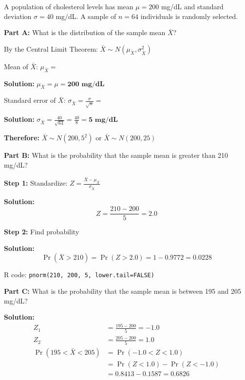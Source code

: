 \documentclass[11pt]{article}
\begin{document}
A population of cholesterol levels has mean $\mu = 200$ mg/dL and standard deviation $\sigma = 40$ mg/dL. A sample of $n = 64$ individuals is randomly selected.

\textbf{Part A:} What is the distribution of the sample mean $\bar{X}$?

By the Central Limit Theorem: $\bar{X} \sim N(\mu_{\bar{X}}, \sigma_{\bar{X}}^2)$

Mean of $\bar{X}$: $\mu_{\bar{X}} = $

\textcolor{correctgreen}{\textbf{Solution:}} $\mu_{\bar{X}} = \mu = \mathbf{200 \text{ mg/dL}}$

Standard error of $\bar{X}$: $\sigma_{\bar{X}} = \frac{\sigma}{\sqrt{n}} = $

\textcolor{correctgreen}{\textbf{Solution:}} $\sigma_{\bar{X}} = \frac{40}{\sqrt{64}} = \frac{40}{8} = \mathbf{5 \text{ mg/dL}}$

\textbf{Therefore:} $\bar{X} \sim N(200, 5^2)$ or $\bar{X} \sim N(200, 25)$

\vspace{0.5cm}

\textbf{Part B:} What is the probability that the sample mean is greater than 210 mg/dL?

\textbf{Step 1:} Standardize: $Z = \frac{\bar{X} - \mu_{\bar{X}}}{\sigma_{\bar{X}}}$

\textcolor{correctgreen}{\textbf{Solution:}}
$$Z = \frac{210 - 200}{5} = 2.0$$

\textbf{Step 2:} Find probability

\textcolor{correctgreen}{\textbf{Solution:}}
$$\Pr(\bar{X} > 210) = \Pr(Z > 2.0) = 1 - 0.9772 = \mathbf{0.0228}$$

R code: \texttt{pnorm(210, 200, 5, lower.tail=FALSE)}

\vspace{0.5cm}

\textbf{Part C:} What is the probability that the sample mean is between 195 and 205 mg/dL?

\textcolor{correctgreen}{\textbf{Solution:}}
\begin{align*}
Z_1 &= \frac{195 - 200}{5} = -1.0\\
Z_2 &= \frac{205 - 200}{5} = 1.0\\
\Pr(195 < \bar{X} < 205) &= \Pr(-1.0 < Z < 1.0)\\
&= \Pr(Z < 1.0) - \Pr(Z < -1.0)\\
&= 0.8413 - 0.1587 = \mathbf{0.6826}
\end{align*}
\end{document}
